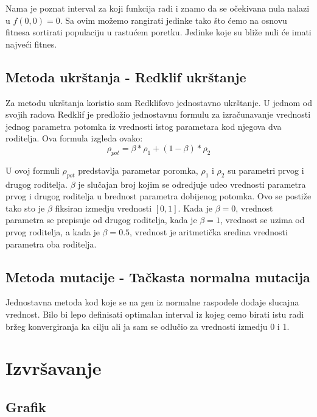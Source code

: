 \documentclass[a4paper,11pt]{book}
\begin{document}
Nama je poznat interval za koji funkcija radi i znamo da se očekivana nula nalazi u $f(0,0)=0$. Sa ovim možemo rangirati jedinke tako što ćemo na osnovu fitnesa sortirati populaciju u rastućem poretku. Jedinke koje su bliže nuli će imati najveći fitnes.

\section{Metoda ukrštanja - Redklif ukrštanje}

Za metodu ukrštanja koristio sam Redklifovo jednostavno ukrštanje. U jednom od svojih radova Redklif je predložio jednostavnu formulu za izračunavanje vrednosti jednog parametra potomka iz vrednosti istog parametara kod njegova dva roditelja. Ova formula izgleda ovako:
\[\rho_{pot} = \beta * \rho_{1} + (1-\beta) * \rho_{2}\]

U ovoj formuli $\rho_{pot}$ predstavlja parametar poromka, $\rho_{1}$ i $\rho_{2}$ su parametri prvog i drugog roditelja. $\beta$ je slučajan broj kojim se odredjuje udeo vrednosti parametra prvog i drugog roditelja u brednost parametra dobijenog potomka. Ovo se postiže tako sto je $\beta$ fiksiran izmedju vrednosti $[0,1]$. Kada je $\beta=0$, vrednost parametra se prepisuje od drugog roditelja, kada je $\beta=1$, vrednost se uzima od prvog roditelja, a kada je $\beta=0.5$, vrednost je aritmetička sredina vrednosti parametra oba roditelja.

\section{Metoda mutacije - Tačkasta normalna mutacija}

Jednostavna metoda kod koje se na gen iz normalne raspodele dodaje slucajna vrednost. Bilo bi lepo definisati optimalan interval iz kojeg cemo birati istu radi bržeg konvergiranja ka cilju ali ja sam se odlučio za vrednosti izmedju 0 i 1.

\chapter{Izvršavanje}

\section{Grafik}
\end{document}
